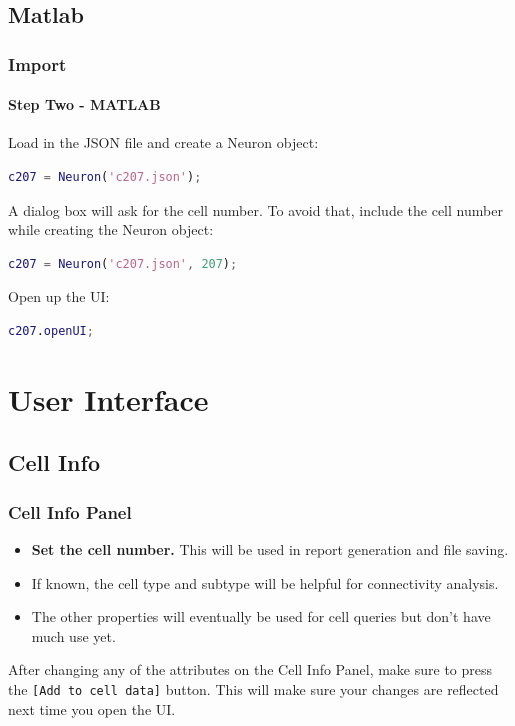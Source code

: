 \documentclass[11pt]{beamer}
\begin{document}
\subsection{Matlab}
\begin{frame}[fragile]
	\frametitle{Import}
	\framesubtitle{Step Two - MATLAB}
	Load in the JSON file and create a Neuron object:
	\begin{lstlisting}[language=matlab]
c207 = Neuron('c207.json');\end{lstlisting}
	A dialog box will ask for the cell number. To avoid that, include the cell number while creating the Neuron object:
	\begin{lstlisting}[language=matlab]
c207 = Neuron('c207.json', 207);\end{lstlisting}
	Open up the UI:
	\begin{lstlisting}[language=matlab]
c207.openUI;\end{lstlisting}
\end{frame}
	\section{User Interface}
	\subsection{Cell Info}
	\begin{frame}
		\frametitle{Cell Info Panel}
		\begin{itemize}
			\item \textbf{Set the cell number.} This will be used in report generation and file saving. 
			\item If known, the cell type and subtype will be helpful for connectivity analysis.
			\item The other properties will eventually be used for cell queries but don't have much use yet.
		\end{itemize}
			After changing any of the attributes on the Cell Info Panel, make sure to press the \texttt{[Add to cell data]} button. This will make sure your changes are reflected next time you open the UI.\\
	\end{frame}
	
\end{document}
